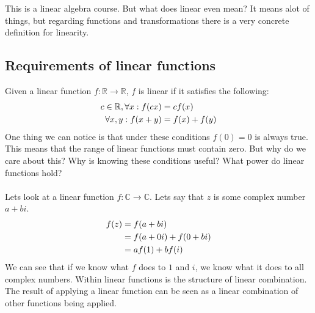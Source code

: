 \documentclass[../main.tex]{subfiles}
\begin{document}
This is a linear algebra course. But what does linear even mean? It means alot of things, but regarding functions and transformations there is a very concrete definition for linearity. 
\subsection{Requirements of linear functions}
Given a linear function $f:\mathbb{R}\rightarrow \mathbb{R}$, $f$ is linear if it satisfies the following:
\begin{align}
	c \in \mathbb{R}, \forall x : f(cx) &= cf(x) \notag \\
	\forall x, y : f(x + y) &= f(x) + f(y) \notag
\end{align}
One thing we can notice is that under these conditions $f(0) = 0$ is always true. This means that the range of linear functions must contain zero. But why do we care about this? Why is knowing these conditions useful? What power do linear functions hold? \\ \\ 
Lets look at a linear function $f:\mathbb{C}\rightarrow\mathbb{C}$. Lets say that $z$ is some complex number $a + bi$.
\begin{align}
	f(z) &= f(a + bi) \notag \\
	     &= f(a + 0i) + f(0 + bi) \notag \\
	     &= af(1) + bf(i) \notag
\end{align}
We can see that if we know what $f$ does to $1$ and $i$, we know what it does to all complex numbers. Within linear functions is the structure of linear combination. The result of applying a linear function can be seen as a linear combination of other functions being applied.
\end{document}
